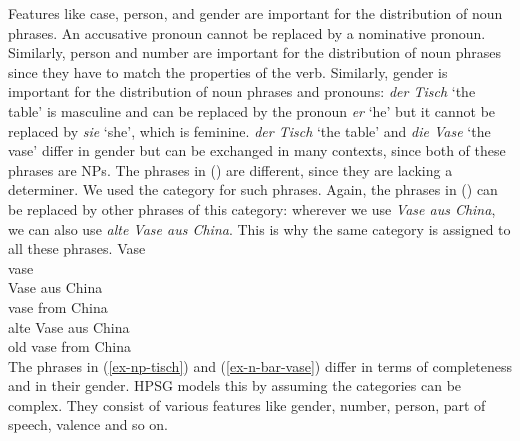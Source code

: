 Features like case, person, and gender are important for the distribution of noun
phrases. An accusative pronoun cannot be replaced by a nominative pronoun. Similarly, person and
number are important for the distribution of noun phrases since they have to match the properties of
the verb. Similarly, gender is important for the distribution of noun phrases and pronouns:
\emph{der Tisch} `the table' is masculine and can be replaced by the pronoun \emph{er} `he' but it
cannot be replaced by \emph{sie} `she', which is feminine. \emph{der Tisch} `the table' and
\emph{die Vase} `the vase' differ in gender but can be exchanged in many contexts, since both of
these phrases are NPs. The phrases in () are different, since they are lacking a
determiner. We used the category \nbar for such phrases. Again, the phrases in () can be
replaced by other phrases of this category: wherever we use \emph{Vase aus China}, we can also use
\emph{alte Vase aus China}. This is why the same category is assigned to all these phrases.
\eal
\label{ex-n-bar-vase}
\ex 
\gll Vase\\
     vase\\
\ex 
\gll Vase aus China\\
     vase from China\\
\ex 
\gll alte Vase aus China\\
     old  vase from China\\
\zl
The phrases in (\ref{ex-np-tisch}) and (\ref{ex-n-bar-vase}) differ in terms of completeness and in
their gender. HPSG models this by assuming the categories can be complex. They consist of various
features like gender, number, person, part of speech, valence and so on.

